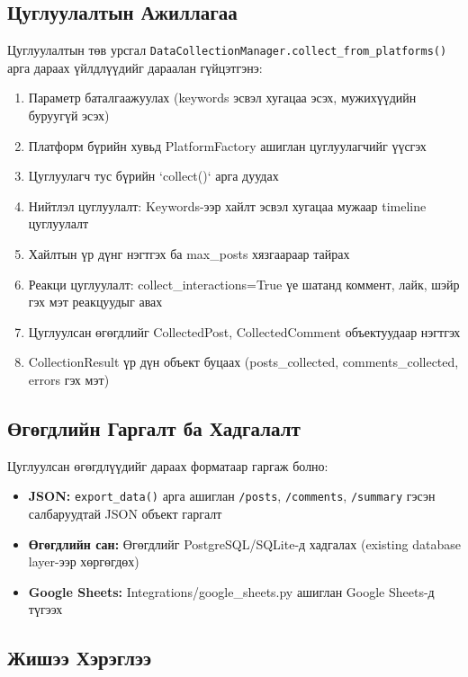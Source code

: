 \documentclass[12pt,a4paper]{report}
\begin{document}
\subsection{Цуглуулалтын Ажиллагаа}

Цуглуулалтын төв урсгал \texttt{DataCollectionManager.collect\_from\_platforms()} арга дараах үйлдлүүдийг дараалан гүйцэтгэнэ:

\begin{enumerate}
    \item Параметр баталгаажуулах (keywords эсвэл хугацаа эсэх, мужихүүдийн буруугүй эсэх)
    \item Платформ бүрийн хувьд PlatformFactory ашиглан цуглуулагчийг үүсгэх
    \item Цуглуулагч тус бүрийн `collect()` арга дуудах
    \item Нийтлэл цуглуулалт: Keywords-ээр хайлт эсвэл хугацаа мужаар timeline цуглуулалт
    \item Хайлтын үр дүнг нэгтгэх ба max\_posts хязгаараар тайрах
    \item Реакци цуглуулалт: collect\_interactions=True үе шатанд коммент, лайк, шэйр гэх мэт реакцуудыг авах
    \item Цуглуулсан өгөгдлийг CollectedPost, CollectedComment объектуудаар нэгтгэх
    \item CollectionResult үр дүн объект буцаах (posts\_collected, comments\_collected, errors гэх мэт)
\end{enumerate}

\subsection{Өгөгдлийн Гаргалт ба Хадгалалт}

Цуглуулсан өгөгдлүүдийг дараах форматаар гаргаж болно:

\begin{itemize}
    \item \textbf{JSON:} \texttt{export\_data()} арга ашиглан \texttt{/posts}, \texttt{/comments}, \texttt{/summary} гэсэн салбаруудтай JSON объект гаргалт
    \item \textbf{Өгөгдлийн сан:} Өгөгдлийг PostgreSQL/SQLite-д хадгалах (existing database layer-ээр хөргөгдөх)
    \item \textbf{Google Sheets:} Integrations/google\_sheets.py ашиглан Google Sheets-д түгээх
\end{itemize}

\subsection{Жишээ Хэрэглээ}
\end{document}

